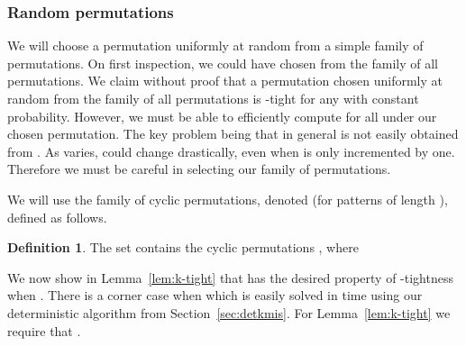 \documentclass[11pt]{article}
\theoremstyle{plain}
\theoremstyle{definition}
\newtheorem{definition}[theorem]{Definition}
\begin{document}
\subsubsection{Random permutations} \label{sec:permutations}

We will choose a permutation uniformly at random  from a simple family of permutations. On first inspection, we could have chosen from the family of all permutations. We claim without proof that a permutation chosen uniformly at random from the family of all permutations is -tight for any  with constant probability. However, we must be able to efficiently compute   for all  under our chosen permutation. The key problem being that in general  is not easily obtained from . As  varies,  could change drastically, even when  is only incremented by one. Therefore we must be careful in selecting our family of permutations.

We will use the family of cyclic permutations, denoted  (for patterns of length ), defined as follows.

\begin{definition}
    \label{dfn:cperm}
    The set  contains the  cyclic permutations , where

\end{definition}

We now show in Lemma~\ref{lem:k-tight} that  has the desired property of -tightness when . There is a corner case when  which is easily solved in  time using our deterministic algorithm from Section~\ref{sec:detkmis}. For Lemma~\ref{lem:k-tight} we require that .
\end{document}
